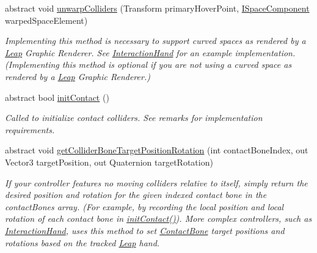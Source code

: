 \begin{DoxyCompactItemize}
abstract void \mbox{\hyperlink{class_leap_1_1_unity_1_1_interaction_1_1_interaction_controller_aef6aebf580bed0a675b59e1c4a267376}{unwarp\+Colliders}} (Transform primary\+Hover\+Point, \mbox{\hyperlink{interface_leap_1_1_unity_1_1_space_1_1_i_space_component}{I\+Space\+Component}} warped\+Space\+Element)
\begin{DoxyCompactList}\small\item\em Implementing this method is necessary to support curved spaces as rendered by a \mbox{\hyperlink{namespace_leap_1_1_unity_1_1_leap}{Leap}} Graphic Renderer. See \mbox{\hyperlink{class_leap_1_1_unity_1_1_interaction_1_1_interaction_hand}{Interaction\+Hand}} for an example implementation. (Implementing this method is optional if you are not using a curved space as rendered by a \mbox{\hyperlink{namespace_leap_1_1_unity_1_1_leap}{Leap}} Graphic Renderer.) \end{DoxyCompactList}\item 
abstract bool \mbox{\hyperlink{class_leap_1_1_unity_1_1_interaction_1_1_interaction_controller_a5d9713dd48f3093aefbd8ebbba3b0251}{init\+Contact}} ()
\begin{DoxyCompactList}\small\item\em Called to initialize contact colliders. See remarks for implementation requirements. \end{DoxyCompactList}\item 
abstract void \mbox{\hyperlink{class_leap_1_1_unity_1_1_interaction_1_1_interaction_controller_ae5ccd0183ff87fd51107a5b082116ce0}{get\+Collider\+Bone\+Target\+Position\+Rotation}} (int contact\+Bone\+Index, out Vector3 target\+Position, out Quaternion target\+Rotation)
\begin{DoxyCompactList}\small\item\em If your controller features no moving colliders relative to itself, simply return the desired position and rotation for the given indexed contact bone in the contact\+Bones array. (For example, by recording the local position and local rotation of each contact bone in \mbox{\hyperlink{class_leap_1_1_unity_1_1_interaction_1_1_interaction_controller_a5d9713dd48f3093aefbd8ebbba3b0251}{init\+Contact()}}). More complex controllers, such as \mbox{\hyperlink{class_leap_1_1_unity_1_1_interaction_1_1_interaction_hand}{Interaction\+Hand}}, uses this method to set \mbox{\hyperlink{class_leap_1_1_unity_1_1_interaction_1_1_contact_bone}{Contact\+Bone}} target positions and rotations based on the tracked \mbox{\hyperlink{namespace_leap_1_1_unity_1_1_leap}{Leap}} hand. \end{DoxyCompactList}\item 

\end{DoxyCompactItemize}
